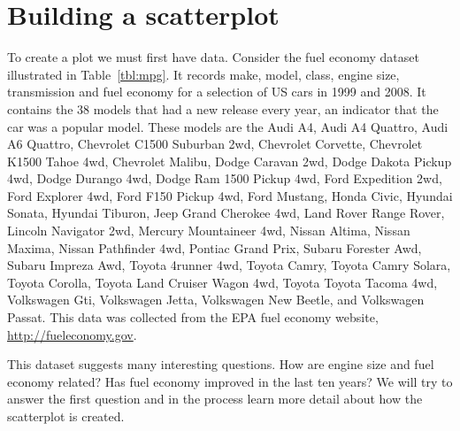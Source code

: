 \section{Building a scatterplot}
\label{sec:simple-plot}

To create a plot we must first have data.  Consider the fuel economy dataset illustrated in Table~\ref{tbl:mpg}.  It records make, model, class, engine size, transmission and fuel economy for a selection of US cars in 1999 and 2008.  It contains the 38 models that had a new release every year, an indicator that the car was a popular model.  These models are the Audi A4, Audi A4 Quattro, Audi A6 Quattro, Chevrolet C1500 Suburban 2wd, Chevrolet Corvette, Chevrolet K1500 Tahoe 4wd, Chevrolet Malibu, Dodge Caravan 2wd, Dodge Dakota Pickup 4wd, Dodge Durango 4wd, Dodge Ram 1500 Pickup 4wd, Ford Expedition 2wd, Ford Explorer 4wd, Ford F150 Pickup 4wd, Ford Mustang, Honda Civic, Hyundai Sonata, Hyundai Tiburon, Jeep Grand Cherokee 4wd, Land Rover Range Rover, Lincoln Navigator 2wd, Mercury Mountaineer 4wd, Nissan Altima, Nissan Maxima, Nissan Pathfinder 4wd, Pontiac Grand Prix, Subaru Forester Awd, Subaru Impreza Awd, Toyota 4runner 4wd, Toyota Camry, Toyota Camry Solara, Toyota Corolla, Toyota Land Cruiser Wagon 4wd, Toyota Toyota Tacoma 4wd, Volkswagen Gti, Volkswagen Jetta, Volkswagen New Beetle, and Volkswagen Passat.  This data was collected from the EPA fuel economy website, \url{http://fueleconomy.gov}.

This dataset suggests many interesting questions.  How are engine size and fuel economy related?  Has fuel economy improved in the last ten years?  We will try to answer the first question and in the process learn more detail about how the scatterplot is created.


